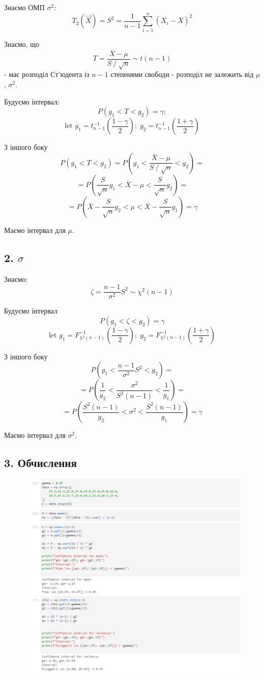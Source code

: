 \documentclass[11pt, a4paper]{article} %
\begin{document}
Знаємо ОМП $\sigma^2$:
$$T_2(\vec X) = S^2 = \frac{1}{n-1} \sum_{{i=1}}^n (X_i - \overline X)^2$$

Знаємо, що $$T = \frac{\overline{X} - \mu}{S \fracslash \sqrt{n}} \sim t(n-1)$$
- має розподіл Ст'юдента із $n-1$ степенями свободи - розподіл не залежить від $\mu$, $\sigma^2$.

Будуємо інтервал:
$$P(g_1 < T < g_2) = \gamma;$$
$$\text{let } g_1 = t_{n-1}^{-1}(\frac{1-\gamma}{2}); \; g_2 = t_{n-1}^{-1}(\frac{1+\gamma}{2})$$

З іншого боку
$$P(g_1 < T < g_2) = P(g_1 < \frac{\overline{X} - \mu}{S \fracslash \sqrt{n}} < g_2) = $$
$$= P(\frac{S}{\sqrt n} g_1 < \overline X - \mu < \frac{S}{\sqrt n}  g_2) = $$
$$= P(\overline X - \frac{S}{\sqrt n} g_2 < \mu < \overline X - \frac{S}{\sqrt n} g_1) = \gamma$$

Маємо інтервал для $\mu$.

\subsection*{2. $\sigma$}
Знаємо:
$$\zeta = \frac{n-1}{\sigma^2} S^2 \sim \chi^2(n-1)$$

Будуємо інтервал
$$P(g_1 < \zeta < g_2) = \gamma$$
$$\text{let } g_1 = F_{\chi^2(n-1)}^{-1}(\frac{1-\gamma}{2}); \; g_2 = F_{\chi^2(n-1)}^{-1}(\frac{1+\gamma}{2})$$

З іншого боку
$$P(g_1 < \frac{n-1}{\sigma^2} S^2 < g_2) = $$
$$= P(\frac{1}{g_2} < \frac{\sigma^2}{S^2(n-1)} < \frac{1}{g_1}) = $$
$$= P(\frac{S^2(n-1)}{g_2} < \sigma^2 < \frac{S^2(n-1)}{g_1}) = \gamma$$

Маємо інтервал для $\sigma^2$.

\subsection*{3. Обчислення}

\begin{figure}[h]
    \centering
    \includegraphics[width=1\textwidth]{img/task2.png}
\end{figure}
\end{document}

